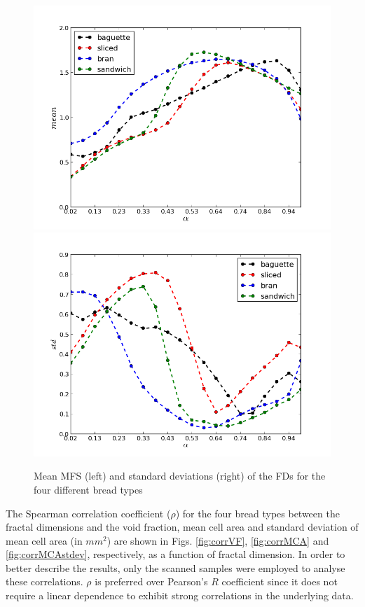\begin{figure}
\centering
\includegraphics[scale=0.4]{../images/means}
\includegraphics[scale=0.4]{../images/stdev}
\caption{Mean MFS (left) and standard deviations (right) of the FDs for the four different bread types}
\label{fig:meansMFS}
\end{figure}

The Spearman correlation coefficient ($\rho$) for the four bread types between the fractal dimensions and the void fraction, mean cell area and standard deviation of mean cell area (in $mm^{2}$) are shown in Figs. \ref{fig:corrVF}, \ref{fig:corrMCA} and \ref{fig:corrMCAstdev}, respectively, as a function of fractal dimension. In order to better describe the results, only the scanned samples were employed to analyse these correlations. $\rho$ is preferred over Pearson's $R$ coefficient since it does not require a linear dependence to exhibit strong correlations in the underlying data.


